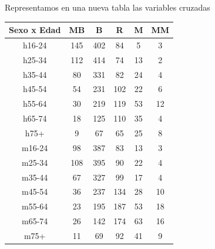 \begin{itemize}
    Representamos en una nueva tabla las variables cruzadas

    \begin{center}
        \begin{tabular}{|c|c|c|c|c|c|}
            \hline
            Sexo x Edad &  MB  &  B  &  R  &  M  &  MM  \\
            \hline
            h16-24      &  145 & 402 &  84 &   5 &   3 \\
            h25-34      &  112 & 414 &  74 &  13 &   2 \\
            h35-44      &   80 & 331 &  82 &  24 &   4 \\
            h45-54      &   54 & 231 & 102 &  22 &   6 \\
            h55-64      &   30 & 219 & 119 &  53 &  12 \\
            h65-74      &   18 & 125 & 110 &  35 &   4 \\
            h75+        &    9 &  67 &  65 &  25 &   8 \\
            m16-24      &   98 & 387 &  83 &  13 &   3 \\
            m25-34      &  108 & 395 &  90 &  22 &   4 \\
            m35-44      &   67 & 327 &  99 &  17 &   4 \\
            m45-54      &   36 & 237 & 134 &  28 &  10 \\
            m55-64      &   23 & 195 & 187 &  53 &  18 \\
            m65-74      &   26 & 142 & 174 &  63 &  16 \\
            m75+        &   11 &  69 &  92 &  41 &   9 \\
            \hline
        \end{tabular}
    \end{center}
    

\end{itemize}
